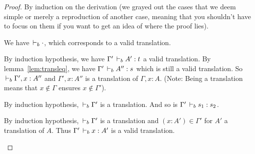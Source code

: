 \documentclass[a4paper,english]{lipics-utf8x}
\begin{document}
  \begin{proof}
    By induction on the derivation (we grayed out the cases that we deem
    simple or merely a reproduction of another case, meaning that you shouldn't
    have to focus on them if you want to get an idea of where the proof lies).

    \leavevmode
    \begin{caselist}
      \begin{graycase}
        \begin{mathc}
          \ru{}{\derr \cdot}
        \end{mathc}
        We have $\,\vdash_b \cdot$, which corresponds to a valid translation.
      \end{graycase}

      \begin{graycase}
        \begin{mathc}
        \end{mathc}
        By induction hypothesis, we have $\Gamma' \,\vdash_b A' : t$ a valid
        translation. By lemma~\ref{lem:transleq}, we have
        $\Gamma' \,\vdash_b A'' : s$ which is still a valid translation.
        So $\,\vdash_b \Gamma', x : A''$ and $\Gamma', x : A''$ is a translation of
        $\Gamma, x : A$.
        (Note: Being a translation means that $x \notin \Gamma$ ensures
        $x \notin \Gamma'$).
      \end{graycase}

      \begin{graycase}
        \begin{mathc}
        \end{mathc}
        By induction hypothesis, $\,\vdash_b \Gamma'$ is a translation.
        And so is $\Gamma' \,\vdash_b s_1 : s_2$.
      \end{graycase}

      \begin{graycase}
        \begin{mathc}
        \end{mathc}
        By induction hypothesis, $\,\vdash_b \Gamma'$ is a translation and
        $(x : A') \in \Gamma'$ for $A'$ a translation of $A$.
        Thus $\Gamma' \,\vdash_b x : A'$ is a valid translation.
      \end{graycase}


\end{caselist}
\end{proof}
\end{document}
